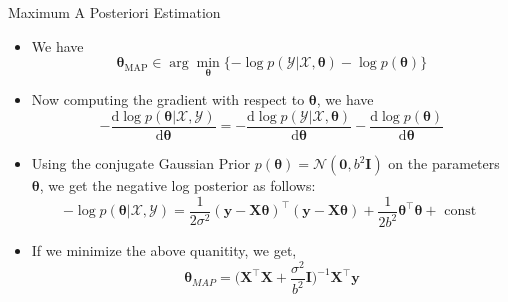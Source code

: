 \documentclass{beamer}
\begin{document}
\begin{frame}{Maximum A Posteriori Estimation}
\begin{itemize}[<+->]
\item We have 
\begin{equation*}
\boldsymbol{\theta}_{\mathrm{MAP}} \in \arg \min _{\boldsymbol{\theta}}\{-\log p(\mathcal{Y} | \mathcal { X }, \boldsymbol{\theta})-\log p(\boldsymbol{\theta})\}
\end{equation*}
\item Now computing the gradient with respect to $\boldsymbol{\theta}$, we have 
\begin{equation*}
-\frac{\mathrm{d} \log p(\boldsymbol{\theta} | \mathcal{X}, \mathcal{Y})}{\mathrm{d} \boldsymbol{\theta}}=-\frac{\mathrm{d} \log p(\mathcal{Y} | \mathcal{X}, \boldsymbol{\theta})}{\mathrm{d} \boldsymbol{\theta}}-\frac{\mathrm{d} \log p(\boldsymbol{\theta})}{\mathrm{d} \boldsymbol{\theta}}
\end{equation*}
\item Using the conjugate Gaussian Prior $p(\boldsymbol{\theta}) = \mathcal{N}(\boldsymbol{0}, b^{2}\boldsymbol{I})$ on the parameters $\boldsymbol{\theta}$, we get the negative log posterior as follows:
\begin{equation*}
-\log p(\boldsymbol{\theta} | \mathcal{X}, \mathcal{Y})=\frac{1}{2 \sigma^{2}}(\boldsymbol{y}-\boldsymbol{X} \boldsymbol{\theta})^{\top}(\boldsymbol{y}-\boldsymbol{X} \boldsymbol{\theta})+\frac{1}{2 b^{2}} \boldsymbol{\theta}^{\top} \boldsymbol{\theta}+\text { const }
\end{equation*}
\item If we minimize the above quanitity, we get,
\begin{equation*}
    \boldsymbol{\theta}_{MAP} = \big(\boldsymbol{X^{\top}X} + \frac{\sigma^{2}}{b^{2}}\boldsymbol{I}\big)^{-1}\boldsymbol{X}^{\top}\boldsymbol{y}
\end{equation*}
\end{itemize}


\end{frame}
\end{document}
